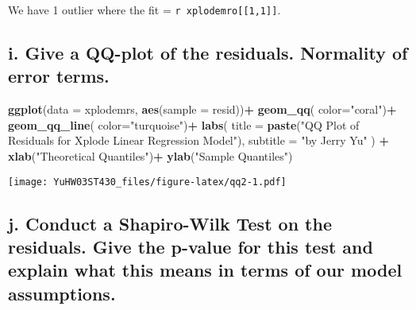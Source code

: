\documentclass[
]{article}
\newenvironment{Shaded}{\begin{snugshade}}{\end{snugshade}}
\newcommand{\AttributeTok}[1]{\textcolor[rgb]{0.13,0.29,0.53}{#1}}
\newcommand{\FunctionTok}[1]{\textcolor[rgb]{0.13,0.29,0.53}{\textbf{#1}}}
\newcommand{\NormalTok}[1]{#1}
\newcommand{\OtherTok}[1]{\textcolor[rgb]{0.56,0.35,0.01}{#1}}
\newcommand{\SpecialCharTok}[1]{\textcolor[rgb]{0.81,0.36,0.00}{\textbf{#1}}}
\newcommand{\StringTok}[1]{\textcolor[rgb]{0.31,0.60,0.02}{#1}}
\begin{document}
We have 1 outlier where the fit = \texttt{r\ xplodemro{[}{[}1,1{]}{]}}.

\hypertarget{i.-give-a-qq-plot-of-the-residuals.-normality-of-error-terms.}{%
\subsection{i. Give a QQ-plot of the residuals. Normality of error
terms.}\label{i.-give-a-qq-plot-of-the-residuals.-normality-of-error-terms.}}

\begin{Shaded}
\begin{Highlighting}[]
\FunctionTok{ggplot}\NormalTok{(}\AttributeTok{data =}\NormalTok{ xplodemrs, }\FunctionTok{aes}\NormalTok{(}\AttributeTok{sample =}\NormalTok{ resid))}\SpecialCharTok{+}
  \FunctionTok{geom\_qq}\NormalTok{( }\AttributeTok{color=}\StringTok{"coral"}\NormalTok{)}\SpecialCharTok{+}
  \FunctionTok{geom\_qq\_line}\NormalTok{( }\AttributeTok{color=}\StringTok{"turquoise"}\NormalTok{)}\SpecialCharTok{+}
  \FunctionTok{labs}\NormalTok{(}
    \AttributeTok{title =} \FunctionTok{paste}\NormalTok{(}\StringTok{"QQ Plot of Residuals for Xplode Linear Regression Model"}\NormalTok{),}
    \AttributeTok{subtitle =} \StringTok{"by Jerry Yu"}
\NormalTok{  ) }\SpecialCharTok{+}
  \FunctionTok{xlab}\NormalTok{(}\StringTok{"Theoretical Quantiles"}\NormalTok{)}\SpecialCharTok{+}
  \FunctionTok{ylab}\NormalTok{(}\StringTok{"Sample Quantiles"}\NormalTok{)}
\end{Highlighting}
\end{Shaded}

\texttt{[image: YuHW03ST430\_files/figure-latex/qq2-1.pdf]}

\hypertarget{j.-conduct-a-shapiro-wilk-test-on-the-residuals.-give-the-p-value-for-this-test-and-explain-what-this-means-in-terms-of-our-model-assumptions.}{%
\subsection{j. Conduct a Shapiro-Wilk Test on the residuals. Give the
p-value for this test and explain what this means in terms of our model
assumptions.}\label{j.-conduct-a-shapiro-wilk-test-on-the-residuals.-give-the-p-value-for-this-test-and-explain-what-this-means-in-terms-of-our-model-assumptions.}}

\begin{Shaded}
\end{Shaded}
\end{document}
